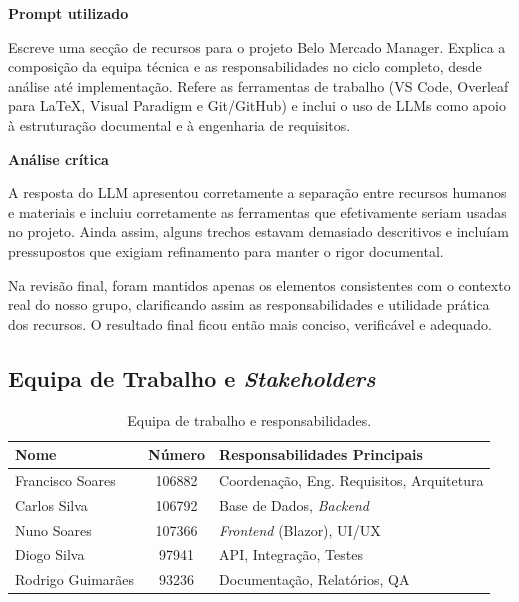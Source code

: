     \begin{tcolorbox}[title=Interação com o LLM]
    \textbf{Prompt utilizado}

    Escreve uma secção de recursos para o projeto Belo Mercado Manager. Explica a composição da equipa técnica e as responsabilidades no ciclo completo, desde análise até implementação. Refere as ferramentas de trabalho (VS Code, Overleaf para LaTeX, Visual Paradigm e Git/GitHub) e inclui o uso de LLMs como apoio à estruturação documental e à engenharia de requisitos.

    \tcblower

    \textbf{Análise crítica}

    A resposta do LLM apresentou corretamente a separação entre recursos humanos e materiais e incluiu corretamente as ferramentas que efetivamente seriam usadas no projeto. Ainda assim, alguns trechos estavam demasiado descritivos e incluíam pressupostos que exigiam refinamento para manter o rigor documental.

    Na revisão final, foram mantidos apenas os elementos consistentes com o contexto real do nosso grupo, clarificando assim as responsabilidades e utilidade prática dos recursos. O resultado final ficou então mais conciso, verificável e adequado.
    \end{tcolorbox}

\subsection{Equipa de Trabalho e \textit{Stakeholders}}

    \begin{table}[H]
    \centering
    \begin{tabular}{|l|c|l|}
    \hline
    \textbf{Nome} & \textbf{Número} & \textbf{Responsabilidades Principais} \\
    \hline
    Francisco Soares & 106882 & Coordenação, Eng. Requisitos, Arquitetura \\
    \hline
    Carlos Silva & 106792 & Base de Dados, \textit{Backend} \\
    \hline
    Nuno Soares & 107366 & \textit{Frontend} (Blazor), UI/UX \\
    \hline
    Diogo Silva & 97941 & API, Integração, Testes \\
    \hline
    Rodrigo Guimarães & 93236 & Documentação, Relatórios, QA \\
    \hline
    \end{tabular}
    \caption{Equipa de trabalho e responsabilidades.}
    \label{tab:equipa}
    \end{table}


